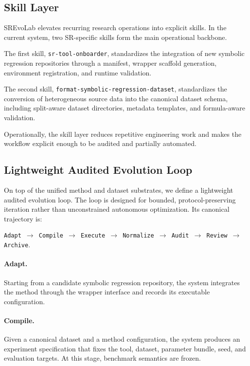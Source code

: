 \subsection{Skill Layer}

SREvoLab elevates recurring research operations into explicit skills. In the current system, two SR-specific skills form the main operational backbone.

The first skill, \texttt{sr-tool-onboarder}, standardizes the integration of new symbolic regression repositories through a manifest, wrapper scaffold generation, environment registration, and runtime validation.

The second skill, \texttt{format-symbolic-regression-dataset}, standardizes the conversion of heterogeneous source data into the canonical dataset schema, including split-aware dataset directories, metadata templates, and formula-aware validation.

Operationally, the skill layer reduces repetitive engineering work and makes the workflow explicit enough to be audited and partially automated.

\subsection{Lightweight Audited Evolution Loop}

On top of the unified method and dataset substrates, we define a lightweight audited evolution loop. The loop is designed for bounded, protocol-preserving iteration rather than unconstrained autonomous optimization. Its canonical trajectory is:
\begin{center}
\texttt{Adapt $\rightarrow$ Compile $\rightarrow$ Execute $\rightarrow$ Normalize $\rightarrow$ Audit $\rightarrow$ Review $\rightarrow$ Archive}.
\end{center}

\paragraph{Adapt.}
Starting from a candidate symbolic regression repository, the system integrates the method through the wrapper interface and records its executable configuration.

\paragraph{Compile.}
Given a canonical dataset and a method configuration, the system produces an experiment specification that fixes the tool, dataset, parameter bundle, seed, and evaluation targets. At this stage, benchmark semantics are frozen.

